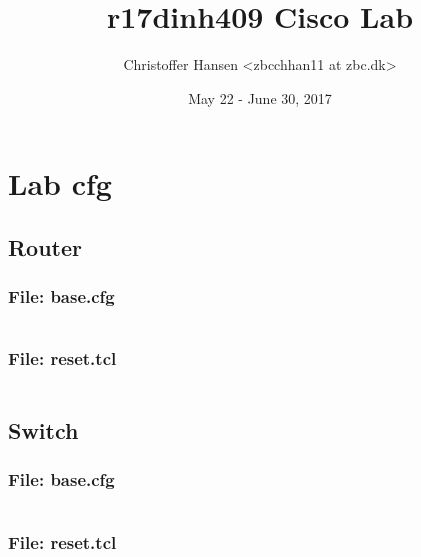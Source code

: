 \documentclass{article}
\begin{document}
\title{r17dinh409 Cisco Lab}
\author{Christoffer Hansen <zbcchhan11 at zbc.dk>}
\date{May 22 - June 30, 2017}
\maketitle

\newpage
\tableofcontents


%
%
\section{Lab cfg}


\subsection{Router}

\subsubsection{File: base.cfg}
\inputminted[frame=lines,framesep=2mm,baselinestretch=1.2,bgcolor=lightgray,fontsize=\footnotesize,linenos,breaklines=true]{powershell}{code/router/base.cfg}
\subsubsection{File: reset.tcl}
\inputminted[frame=lines,framesep=2mm,baselinestretch=1.2,bgcolor=lightgray,fontsize=\footnotesize,linenos,breaklines=true]{powershell}{code/router/reset.tcl}


\subsection{Switch}

\subsubsection{File: base.cfg}
\inputminted[frame=lines,framesep=2mm,baselinestretch=1.2,bgcolor=lightgray,fontsize=\footnotesize,linenos,breaklines=true]{powershell}{code/switch/base.cfg}
\subsubsection{File: reset.tcl}
\inputminted[frame=lines,framesep=2mm,baselinestretch=1.2,bgcolor=lightgray,fontsize=\footnotesize,linenos,breaklines=true]{powershell}{code/switch/reset.tcl}

%
%




%
%
\end{document}
